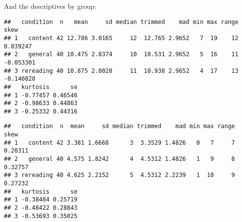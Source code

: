 \documentclass[12pt,]{article}
\newenvironment{Shaded}{\begin{snugshade}}{\end{snugshade}}
\newcommand{\DataTypeTok}[1]{\textcolor[rgb]{0.13,0.29,0.53}{#1}}
\newcommand{\KeywordTok}[1]{\textcolor[rgb]{0.13,0.29,0.53}{\textbf{#1}}}
\newcommand{\NormalTok}[1]{#1}
\newcommand{\OperatorTok}[1]{\textcolor[rgb]{0.81,0.36,0.00}{\textbf{#1}}}
\newcommand{\StringTok}[1]{\textcolor[rgb]{0.31,0.60,0.02}{#1}}
\begin{document}
And the descriptives by group:

\begin{Shaded}
\end{Shaded}

\begin{verbatim}
##   condition  n   mean     sd median trimmed    mad min max range      skew
## 1   content 42 12.786 3.0165     12  12.765 2.9652   7  19    12  0.039247
## 2   general 40 10.475 2.8374     10  10.531 2.9652   5  16    11 -0.053301
## 3 rereading 40 10.875 2.8028     11  10.938 2.9652   4  17    13 -0.140828
##   kurtosis      se
## 1 -0.77457 0.46546
## 2 -0.98633 0.44863
## 3 -0.25332 0.44316
\end{verbatim}

\begin{Shaded}
\end{Shaded}

\begin{verbatim}
##   condition  n  mean     sd median trimmed    mad min max range    skew
## 1   content 42 3.381 1.6668      3  3.3529 1.4826   0   7     7 0.20311
## 2   general 40 4.575 1.8242      4  4.5312 1.4826   1   9     8 0.32757
## 3 rereading 40 4.625 2.2152      5  4.5312 2.2239   1  10     9 0.27232
##   kurtosis      se
## 1 -0.38484 0.25719
## 2 -0.48422 0.28843
## 3 -0.53693 0.35025
\end{verbatim}
\end{document}
